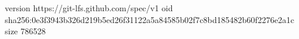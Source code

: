 version https://git-lfs.github.com/spec/v1
oid sha256:0e3f3943b326d219b5ed26f31122a5a84585b02f7c8bd185482b60f2276e2a1c
size 786528
